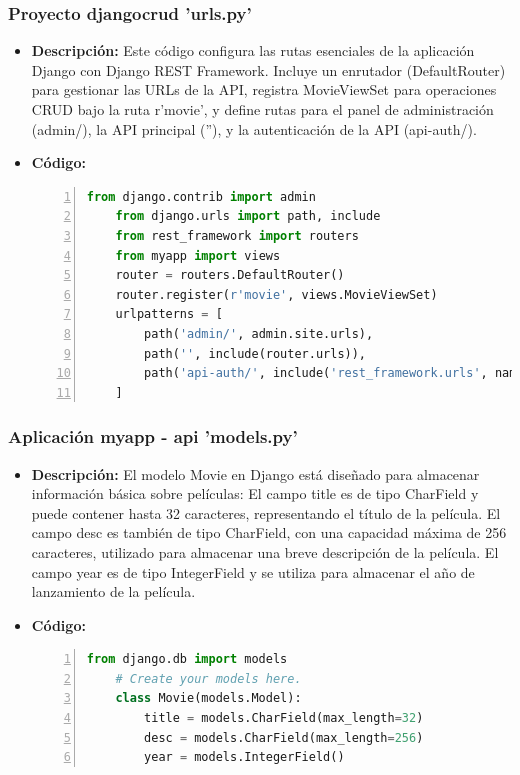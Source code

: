 \documentclass{article}
\begin{document}
  \subsubsection{Proyecto djangocrud 'urls.py'}
  \begin{itemize}
    \item \textbf{Descripción: }Este código configura las rutas esenciales de la aplicación Django con Django REST 
    Framework. Incluye un enrutador (DefaultRouter) para gestionar las URLs de la API, registra MovieViewSet para 
    operaciones CRUD bajo la ruta r'movie', y define rutas para el panel de administración (admin/), la API principal 
    (''), y la autenticación de la API (api-auth/).
    \item \textbf{Código: }
    \begin{lstlisting}[language=python, numbers=left, firstnumber=1, numberstyle=\color{blue}]
    from django.contrib import admin
    from django.urls import path, include
    from rest_framework import routers
    from myapp import views
    router = routers.DefaultRouter()
    router.register(r'movie', views.MovieViewSet)
    urlpatterns = [
        path('admin/', admin.site.urls),
        path('', include(router.urls)),
        path('api-auth/', include('rest_framework.urls', namespace='rest_framework'))
    ]
    \end{lstlisting}
  \end{itemize}
  \subsubsection{Aplicación myapp - api 'models.py'}
  \begin{itemize}
    \item \textbf{Descripción: }El modelo Movie en Django está diseñado para almacenar información básica sobre películas:
    El campo title es de tipo CharField y puede contener hasta 32 caracteres, representando el título de la película.
    El campo desc es también de tipo CharField, con una capacidad máxima de 256 caracteres, utilizado para almacenar una breve descripción de la película.
    El campo year es de tipo IntegerField y se utiliza para almacenar el año de lanzamiento de la película.
    \item \textbf{Código: }
    \begin{lstlisting}[language=python, numbers=left, firstnumber=1, numberstyle=\color{blue}]
    from django.db import models
    # Create your models here.
    class Movie(models.Model):
        title = models.CharField(max_length=32)
        desc = models.CharField(max_length=256)
        year = models.IntegerField()
    \end{lstlisting}
  \end{itemize}
\end{document}
